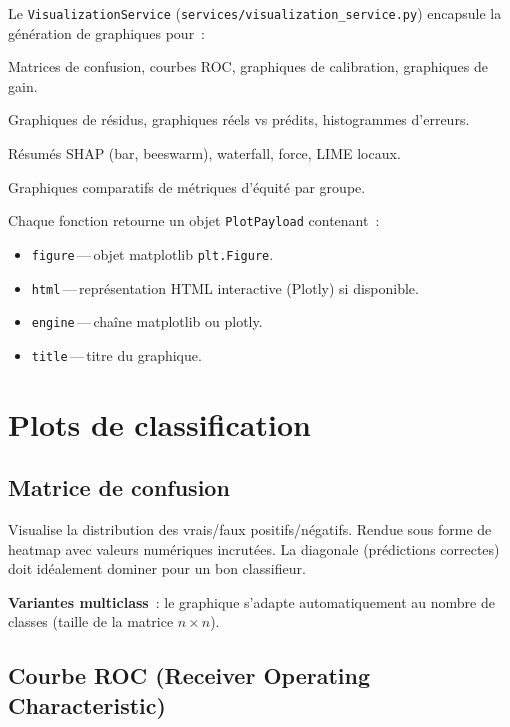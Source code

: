 \documentclass[11pt,a4paper]{report}
\begin{document}
Le \texttt{VisualizationService} (\texttt{services/visualization\_service.py})
encapsule la g\'en\'eration de graphiques pour~:

\begin{description}[font=\sffamily\bfseries\color{accent}]
    \item[Classification]
        Matrices de confusion, courbes ROC, graphiques de calibration,
        graphiques de gain.
    \item[R\'egression]
        Graphiques de r\'esidus, graphiques r\'eels vs pr\'edits, histogrammes
        d'erreurs.
    \item[XAI]
        R\'esum\'es SHAP (bar, beeswarm), waterfall, force, LIME locaux.
    \item[Fairness]
        Graphiques comparatifs de m\'etriques d'\'equit\'e par groupe.
\end{description}

Chaque fonction retourne un objet \texttt{PlotPayload} contenant~:
\begin{itemize}
    \item \texttt{figure}\,---\,objet matplotlib \texttt{plt.Figure}.
    \item \texttt{html}\,---\,repr\'esentation HTML interactive (Plotly)
        si disponible.
    \item \texttt{engine}\,---\,cha\^ine \og matplotlib\fg{} ou \og plotly\fg{}.
    \item \texttt{title}\,---\,titre du graphique.
\end{itemize}

\section{Plots de classification}

\subsection{Matrice de confusion}

Visualise la distribution des vrais/faux positifs/n\'egatifs.
Rendue sous forme de heatmap avec valeurs num\'eriques incrut\'ees.
La diagonale (pr\'edictions correctes) doit id\'ealement dominer
pour un bon classifieur.

\textbf{Variantes multiclass}~: le graphique s'adapte automatiquement
au nombre de classes (taille de la matrice $n \times n$).

\subsection{Courbe ROC (Receiver Operating Characteristic)}
\end{document}
